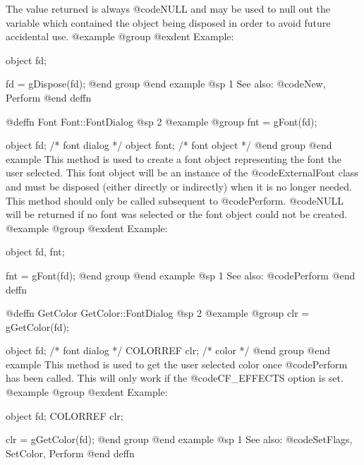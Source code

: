 The value returned is always @code{NULL} and may be used to null out
the variable which contained the object being disposed in order to
avoid future accidental use.
@example
@group
@exdent Example:

object  fd;

fd = gDispose(fd);
@end group
@end example
@sp 1
See also:  @code{New, Perform}
@end deffn











@deffn {Font} Font::FontDialog
@sp 2
@example
@group
fnt = gFont(fd);

object  fd;     /*  font dialog  */
object  font;   /*  font object  */
@end group
@end example
This method is used to create a font object representing the font the
user selected.  This font object will be an instance of the
@code{ExternalFont} class and must be disposed (either directly or
indirectly) when it is no longer needed.  This method should only
be called subsequent to @code{Perform}.  @code{NULL} will be returned
if no font was selected or the font object could not be created.
@example
@group
@exdent Example:

object  fd, fnt;

fnt = gFont(fd);
@end group
@end example
@sp 1
See also:  @code{Perform}
@end deffn











@deffn {GetColor} GetColor::FontDialog
@sp 2
@example
@group
clr = gGetColor(fd);

object   fd;    /*  font dialog  */
COLORREF clr;   /*  color        */
@end group
@end example
This method is used to get the user selected color once @code{Perform}
has been called.  This will only work if the @code{CF_EFFECTS} option
is set.
@example
@group
@exdent Example:

object  fd;
COLORREF clr;

clr = gGetColor(fd);
@end group
@end example
@sp 1
See also:  @code{SetFlags, SetColor, Perform}
@end deffn














